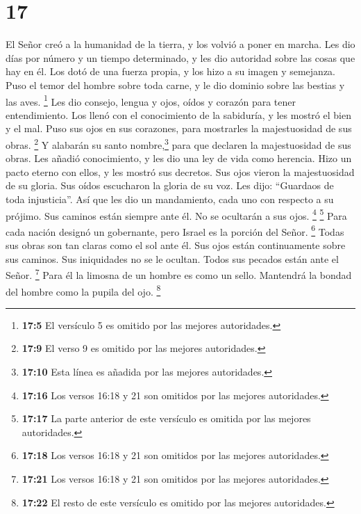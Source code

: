\hypertarget{section-16}{%
\section{17}\label{section-16}}

 El Señor creó a la humanidad de la tierra, y los volvió a
poner en marcha.  Les dio días por número y un tiempo
determinado, y les dio autoridad sobre las cosas que hay en él.
 Los dotó de una fuerza propia, y los hizo a su imagen y
semejanza.  Puso el temor del hombre sobre toda carne, y
le dio dominio sobre las bestias y las aves.  \footnote{\textbf{17:5}
  El versículo 5 es omitido por las mejores autoridades.} 
Les dio consejo, lengua y ojos, oídos y corazón para tener
entendimiento.  Los llenó con el conocimiento de la
sabiduría, y les mostró el bien y el mal.  Puso sus ojos
en sus corazones, para mostrarles la majestuosidad de sus obras.
 \footnote{\textbf{17:9} El verso 9 es omitido por las
  mejores autoridades.}  Y alabarán su santo
nombre,\footnote{\textbf{17:10} Esta línea es añadida por las mejores
  autoridades.} para que declaren la majestuosidad de sus obras.
 Les añadió conocimiento, y les dio una ley de vida como
herencia.  Hizo un pacto eterno con ellos, y les mostró
sus decretos.  Sus ojos vieron la majestuosidad de su
gloria. Sus oídos escucharon la gloria de su voz.  Les
dijo: ``Guardaos de toda injusticia''. Así que les dio un mandamiento,
cada uno con respecto a su prójimo.  Sus caminos están
siempre ante él. No se ocultarán a sus ojos.  \footnote{\textbf{17:16}
  Los versos 16:18 y 21 son omitidos por las mejores autoridades.}
 \footnote{\textbf{17:17} La parte anterior de este
  versículo es omitida por las mejores autoridades.} Para cada nación
designó un gobernante, pero Israel es la porción del Señor.
 \footnote{\textbf{17:18} Los versos 16:18 y 21 son
  omitidos por las mejores autoridades.}  Todas sus obras
son tan claras como el sol ante él. Sus ojos están continuamente sobre
sus caminos.  Sus iniquidades no se le ocultan. Todos sus
pecados están ante el Señor.  \footnote{\textbf{17:21}
  Los versos 16:18 y 21 son omitidos por las mejores autoridades.}
 Para él la limosna de un hombre es como un sello.
Mantendrá la bondad del hombre como la pupila del ojo. \footnote{\textbf{17:22}
  El resto de este versículo es omitido por las mejores autoridades.}
